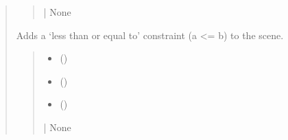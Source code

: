 \documentclass[letterpaper,10pt,english]{sphinxmanual}
\begin{document}
\begin{quote}
\begin{fulllineitems}
\begin{fulllineitems}
\begin{quote}
\begin{description}
\begin{itemize}
\end{itemize}

\sphinxAtStartPar
{} | None

\end{description}\end{quote}

\end{fulllineitems}


\begin{fulllineitems}
\label{\detokenize{pygeox:pygeox.constraint.ConstraintNamespace.leq}}
\pysigstartsignatures
\pysiglinewithargsret
{}
{\sphinxparamcomma {}\sphinxparamcomma {}}
{}
\pysigstopsignatures
\sphinxAtStartPar
Adds a ‘less than or equal to’ constraint (a \textless{}= b) to the scene.
\begin{quote}\begin{description}
\begin{itemize}
\item {} 
\sphinxAtStartPar
{} (\sphinxstyleliteralemphasis{\sphinxupquote{ | }}\sphinxstyleliteralemphasis{\sphinxupquote{ | }})

\item {} 
\sphinxAtStartPar
{} (\sphinxstyleliteralemphasis{\sphinxupquote{ | }}\sphinxstyleliteralemphasis{\sphinxupquote{ | }})

\item {} 
\sphinxAtStartPar
{} (\sphinxstyleliteralemphasis{\sphinxupquote{ | }})

\end{itemize}

\sphinxAtStartPar
{} | None


\end{description}
\end{quote}
\end{fulllineitems}
\end{fulllineitems}
\end{quote}
\end{document}
